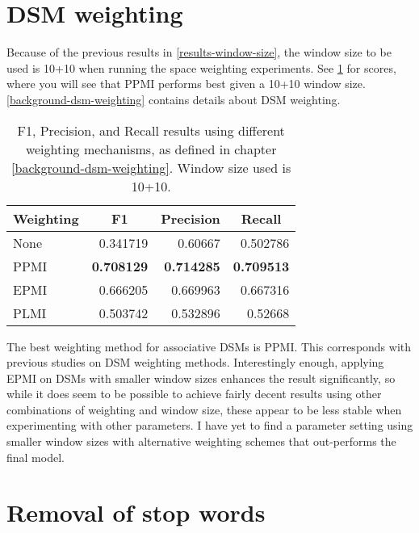 \section{DSM weighting}\label{results-space-weighting}

Because of the previous results in \cref{results-window-size}, the window size to be used is 10+10 when running the space weighting experiments. See \cref{tbl:result-space-weighting} for scores, where you will see that PPMI performs best given a 10+10 window size. \cref{background-dsm-weighting} contains details about DSM weighting.

\begin{table}[H]
\centering
\begin{tabular}{lrrr}
\toprule
 \multicolumn{1}{c}{Weighting} & \multicolumn{1}{c}{F1} & \multicolumn{1}{c}{Precision}
 & \multicolumn{1}{c}{Recall} \\
 \midrule
None            & 0.341719          & 0.60667           & 0.502786          \\
PPMI            & \textbf{0.708129} & \textbf{0.714285} & \textbf{0.709513} \\
EPMI            & 0.666205          & 0.669963          & 0.667316          \\
PLMI            & 0.503742          & 0.532896          & 0.52668           \\
\hline
\end{tabular}
\caption{F1, Precision, and Recall results using different weighting mechanisms, as defined in chapter \ref{background-dsm-weighting}. Window size used is 10+10.}
\label{tbl:result-space-weighting}
\end{table}

The best weighting method for associative DSMs is PPMI. This corresponds with previous studies on DSM weighting methods. Interestingly enough, applying EPMI on DSMs with smaller window sizes enhances the result significantly, so while it does seem to be possible to achieve fairly decent results using other combinations of weighting and window size, these appear to be less stable when experimenting with other parameters. I have yet to find a parameter setting using smaller window sizes with alternative weighting schemes that out-performs the final model.


\section{Removal of stop words}\label{removal-of-stop-words}


